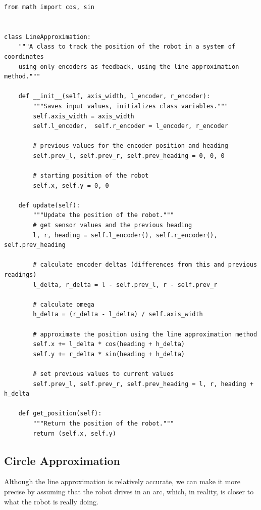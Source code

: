 \documentclass[12pt,twoside]{article}
\begin{document}
\begin{verbatim}
from math import cos, sin


class LineApproximation:
    """A class to track the position of the robot in a system of coordinates
    using only encoders as feedback, using the line approximation method."""

    def __init__(self, axis_width, l_encoder, r_encoder):
        """Saves input values, initializes class variables."""
        self.axis_width = axis_width
        self.l_encoder,  self.r_encoder = l_encoder, r_encoder

        # previous values for the encoder position and heading
        self.prev_l, self.prev_r, self.prev_heading = 0, 0, 0

        # starting position of the robot
        self.x, self.y = 0, 0

    def update(self):
        """Update the position of the robot."""
        # get sensor values and the previous heading
        l, r, heading = self.l_encoder(), self.r_encoder(), self.prev_heading

        # calculate encoder deltas (differences from this and previous readings)
        l_delta, r_delta = l - self.prev_l, r - self.prev_r

        # calculate omega
        h_delta = (r_delta - l_delta) / self.axis_width

        # approximate the position using the line approximation method
        self.x += l_delta * cos(heading + h_delta)
        self.y += r_delta * sin(heading + h_delta)

        # set previous values to current values
        self.prev_l, self.prev_r, self.prev_heading = l, r, heading + h_delta

    def get_position(self):
        """Return the position of the robot."""
        return (self.x, self.y)
\end{verbatim}






\subsection{Circle Approximation}
Although the line approximation is relatively accurate, we can make it more precise by assuming that the robot drives in an arc, which, in reality, is closer to what the robot is really doing.
\end{document}
